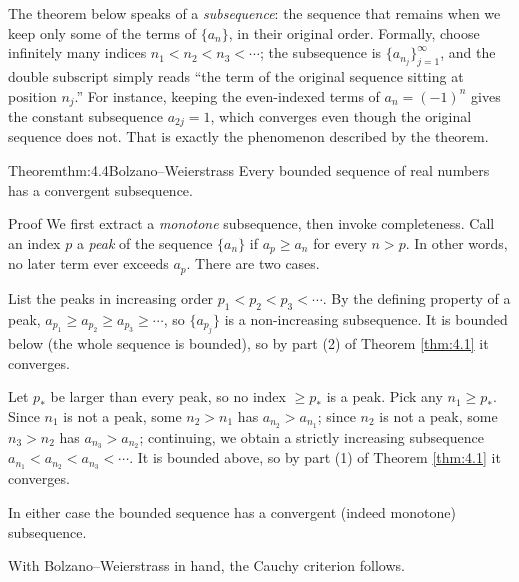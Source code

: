 \documentclass[a4paper,12pt,oneside]{memoir}
\begin{document}
The theorem below speaks of a \emph{subsequence}: the sequence that remains when we keep only some of the terms of \(\{a_{n}\}\), in their original order. Formally, choose infinitely many indices \(n_{1} < n_{2} < n_{3} < \cdots\); the subsequence is \(\{a_{n_{j}}\}_{j = 1}^{\infty}\), and the double subscript simply reads “the term of the original sequence sitting at position \(n_{j}\).” For instance, keeping the even-indexed terms of \(a_{n} = (-1)^{n}\) gives the constant subsequence \(a_{2j} = 1\), which converges even though the original sequence does not. That is exactly the phenomenon described by the theorem.

\begin{envtheorem}{Theorem}{thm:4.4}{Bolzano–Weierstrass}
Every bounded sequence of real numbers has a convergent subsequence.
\end{envtheorem}
\begin{envproof}{Proof}{}{}
We first extract a \emph{monotone} subsequence, then invoke completeness. Call an index \(p\) a \emph{peak} of the sequence \(\{a_{n}\}\) if \(a_{p} \ge a_{n}\) for every \(n > p\). In other words, no later term ever exceeds \(a_{p}\). There are two cases.

List the peaks in increasing order \(p_{1} < p_{2} < p_{3} < \cdots\). By the defining property of a peak, \(a_{p_{1}} \ge a_{p_{2}} \ge a_{p_{3}} \ge \cdots\), so \(\{a_{p_{j}}\}\) is a non-increasing subsequence. It is bounded below (the whole sequence is bounded), so by part (2) of Theorem \ref{thm:4.1} it converges.

Let \(p_{*}\) be larger than every peak, so no index \(\ge p_{*}\) is a peak. Pick any \(n_{1} \ge p_{*}\). Since \(n_{1}\) is not a peak, some \(n_{2} > n_{1}\) has \(a_{n_{2}} > a_{n_{1}}\); since \(n_{2}\) is not a peak, some \(n_{3} > n_{2}\) has \(a_{n_{3}} > a_{n_{2}}\); continuing, we obtain a strictly increasing subsequence \(a_{n_{1}} < a_{n_{2}} < a_{n_{3}} < \cdots\). It is bounded above, so by part (1) of Theorem \ref{thm:4.1} it converges.

In either case the bounded sequence has a convergent (indeed monotone) subsequence. \qedmark
\end{envproof}
With Bolzano–Weierstrass in hand, the Cauchy criterion follows.
\end{document}
